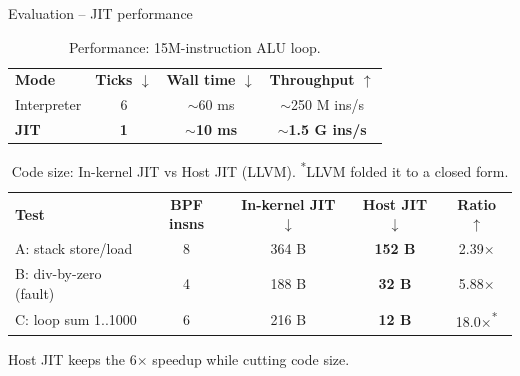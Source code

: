 \documentclass[aspectratio=169,10pt]{beamer}
\newcommand{\takeaway}[1]{%
  \begin{tcolorbox}[enhanced, sharp corners, width=\textwidth,
    colback=takeBG, colframe=takeBG, boxrule=0pt,
    left=10pt, right=10pt, top=6pt, bottom=6pt, halign=center]
    \large #1
  \end{tcolorbox}}
\begin{document}
\begin{frame}{Evaluation -- JIT performance}
  \begin{table}[h]
    \centering
    \renewcommand{\arraystretch}{1.2}
    \begin{tabular}{l c c c}
      \toprule
      \rowcolor{utecnavy}
      \color{white}\textbf{Mode} & \color{white}\textbf{Ticks $\downarrow$} & \color{white}\textbf{Wall time $\downarrow$} & \color{white}\textbf{Throughput $\uparrow$} \\
      Interpreter & 6 & $\sim$60 ms & $\sim$250 M ins/s \\
      \rowcolor{knTint}
      \textbf{JIT} & \textbf{1} & $\sim$\textbf{10 ms} & $\sim$\textbf{1.5 G ins/s} \\
      \bottomrule
    \end{tabular}
    \caption{\footnotesize Performance: 15M-instruction ALU loop.}
  \end{table}
  \begin{table}[h]
    \centering
    \renewcommand{\arraystretch}{1.2}
    \small
    \begin{tabular}{l c c c c}
      \rowcolor{utecnavy}
      \color{white}\textbf{Test} & \color{white}\textbf{BPF insns} & \color{white}\textbf{In-kernel JIT $\downarrow$} & \color{white}\textbf{Host JIT $\downarrow$} & \color{white}\textbf{Ratio $\uparrow$} \\
      A: stack store/load & 8 & 364 B & \textbf{152 B} & 2.39$\times$ \\
      B: div-by-zero (fault) & 4 & 188 B & \textbf{32 B} & 5.88$\times$ \\
      C: loop sum 1..1000 & 6 & 216 B & \textbf{12 B} & 18.0$\times$\textsuperscript{*} \\
      \bottomrule
    \end{tabular}
    \caption{\footnotesize Code size: In-kernel JIT vs Host JIT (LLVM). \textsuperscript{*}LLVM folded it to a closed form.}
  \end{table}
  \vspace{0.1cm}
  \takeaway{Host JIT keeps the 6$\times$ speedup while cutting code size.}
\end{frame}
\end{document}
